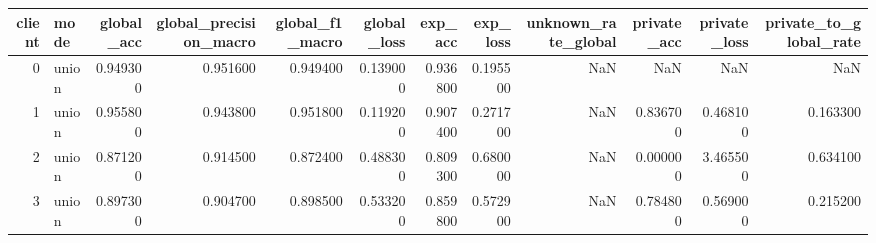 \begin{tabular}{rlrrrrrrrrrr}
\toprule
client & mode & global_acc & global_precision_macro & global_f1_macro & global_loss & exp_acc & exp_loss & unknown_rate_global & private_acc & private_loss & private_to_global_rate \\
\midrule
0 & union & 0.949300 & 0.951600 & 0.949400 & 0.139000 & 0.936800 & 0.195500 & NaN & NaN & NaN & NaN \\
1 & union & 0.955800 & 0.943800 & 0.951800 & 0.119200 & 0.907400 & 0.271700 & NaN & 0.836700 & 0.468100 & 0.163300 \\
2 & union & 0.871200 & 0.914500 & 0.872400 & 0.488300 & 0.809300 & 0.680000 & NaN & 0.000000 & 3.465500 & 0.634100 \\
3 & union & 0.897300 & 0.904700 & 0.898500 & 0.533200 & 0.859800 & 0.572900 & NaN & 0.784800 & 0.569000 & 0.215200 \\
\bottomrule
\end{tabular}
